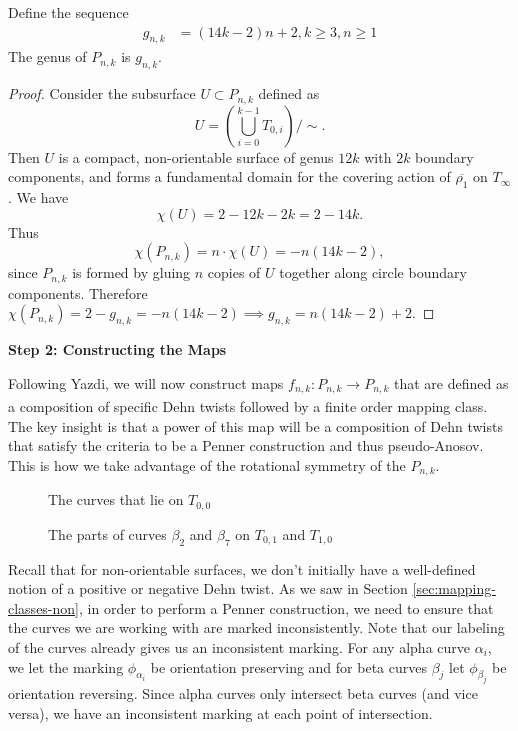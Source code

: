 \begin{lem}
\label{lem:genera}
Define the sequence
\begin{align*}
    g_{n,k} &= (14k - 2)n + 2, k \geq 3, n \geq 1
\end{align*}
    The genus of $P_{n,k}$ is $g_{n,k}$.
\end{lem}
\begin{proof}
    Consider the subsurface $U \subset P_{n,k}$ defined as $$U = \left( \bigcup_{i =0}^{k-1} T_{0,i} \right)/\sim.$$ Then $U$ is a compact, non-orientable surface of genus $12k$ with $2k$ boundary components, and forms a fundamental domain for the covering action of $\overline{\rho_1}$ on $T_\infty$. We have $$\chi(U) = 2 - 12k - 2k = 2 - 14k.$$ Thus $$\chi(P_{n,k}) = n \cdot \chi(U) = -n(14k - 2),$$ since $P_{n,k}$ is formed by gluing $n$ copies of $U$ together along circle boundary components. Therefore $\chi(P_{n,k}) = 2 - g_{n,k} = -n(14k - 2) \implies g_{n,k} = n(14k - 2) + 2$.
\end{proof}

\begin{center}
\textbf{Step 2: Constructing the Maps}
\end{center}


Following Yazdi, we will now construct maps $f_{n,k}: P_{n,k} \xrightarrow[]{} P_{n,k}$ that are defined as a
composition of specific Dehn twists followed by a finite order mapping class. The key insight is that a power
of this map will be a composition of Dehn twists that satisfy the criteria to be a Penner construction and
thus pseudo-Anosov. This is how we take advantage of the rotational symmetry of the $P_{n,k}$.

\begin{figure}[h]
    \centering
    \caption{The curves that lie on $T_{0,0}$}
    \label{fig:curves}
\end{figure}

\begin{figure}[h]
    \centering
    \caption{The parts of curves $\beta_2$ and $\beta_7$ on $T_{0,1}$ and $T_{1,0}$}
    \label{fig:extracurves}
\end{figure}

Recall that for non-orientable surfaces, we don't initially have a well-defined notion of a positive or
negative Dehn twist. As we saw in Section \ref{sec:mapping-classes-non}, in order to perform a Penner
construction, we need to ensure that the curves we are working with are marked inconsistently. Note that our
labeling of the curves already gives us an inconsistent marking. For any alpha curve $\alpha_i$, we let the
marking $\phi_{\alpha_i}$ be orientation preserving and for beta curves $\beta_j$ let $\phi_{\beta_j}$ be
orientation reversing. Since alpha curves only intersect beta curves (and vice versa), we have an inconsistent
marking at each point of intersection.

